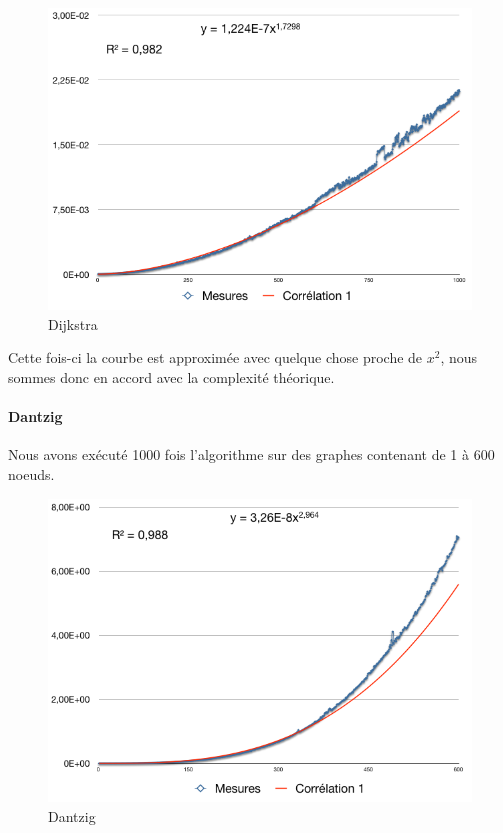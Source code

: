 \documentclass[a4paper,12pt,final] {article}
\begin{document}
\begin{figure}[H]
\begin{center}
\includegraphics[scale=0.4]{dijkstra}
\end{center}
\caption{Dijkstra}
\end{figure}

Cette fois-ci la courbe est approximée avec quelque chose proche de $x^{2}$, nous sommes donc en accord avec la complexité théorique.
\paragraph{Dantzig}
Nous avons exécuté 1000 fois l'algorithme sur des graphes contenant de 1 à 600 noeuds.

\begin{figure}[H]
\begin{center}
\includegraphics[scale=0.4]{dantzig}
\end{center}
\caption{Dantzig}
\end{figure}
\end{document}
